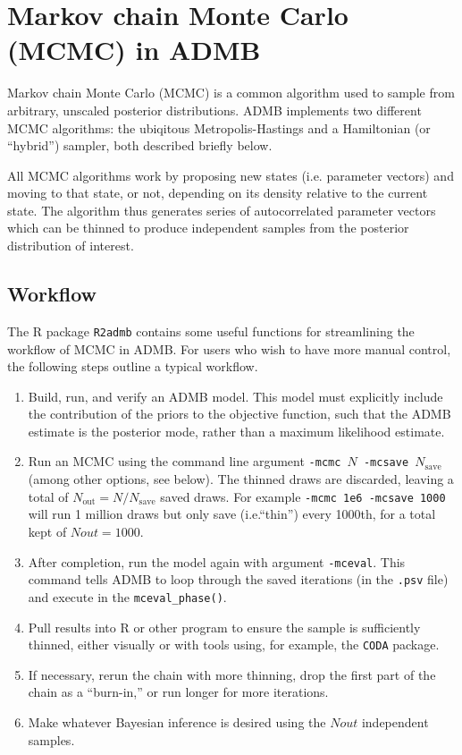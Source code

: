 \documentclass{article}\usepackage[]{graphicx}\usepackage[]{color}
\begin{document}
\section{Markov chain Monte Carlo (MCMC) in ADMB}
Markov chain Monte Carlo (MCMC) is a common algorithm used
to sample from arbitrary, unscaled posterior
distributions. ADMB implements two different MCMC
algorithms: the ubiqitous Metropolis-Hastings and a
Hamiltonian (or ``hybrid'') sampler, both described briefly
below.

All MCMC algorithms work by proposing new states
(i.e. parameter vectors) and moving to that state, or not,
depending on its density relative to the current state. The
algorithm thus generates series of autocorrelated parameter
vectors which can be thinned to produce independent samples
from the posterior distribution of interest.

\subsection{Workflow}
The R package \texttt{R2admb} contains some useful functions
for streamlining the workflow of MCMC in ADMB. For users who
wish to have more manual control, the following steps
outline a typical workflow.
\begin{enumerate}
\item Build, run, and verify an ADMB model. This model must
  explicitly include the contribution of the priors to the
  objective function, such that the ADMB estimate is the
  posterior mode, rather than a maximum likelihood estimate.
\item Run an MCMC using the command line argument
  \texttt{-mcmc $N$ -mcsave $N_{\text{save}}$} (among other
  options, see below). The thinned draws are discarded,
  leaving a total of $N_{\text{out}}=N/N_{\text{save}}$
  saved draws. For example \texttt{-mcmc 1e6 -mcsave 1000}
  will run 1 million draws but only save (i.e.``thin'')
  every 1000th, for a total kept of $Nout=1000$.
\item After completion, run the model again with argument
  \texttt{-mceval}. This command tells ADMB to loop through
  the saved iterations (in the \texttt{.psv} file) and
  execute in the \texttt{mceval\_phase()}.
\item Pull results into R or other program to ensure the
  sample is sufficiently thinned, either visually or with
  tools using, for example, the \texttt{CODA} package.
\item If necessary, rerun the chain with more thinning, drop
  the first part of the chain as a ``burn-in,'' or run
  longer for more iterations.
\item Make whatever Bayesian inference is desired using the
  $Nout$ independent samples.
\end{enumerate}
\end{document}
